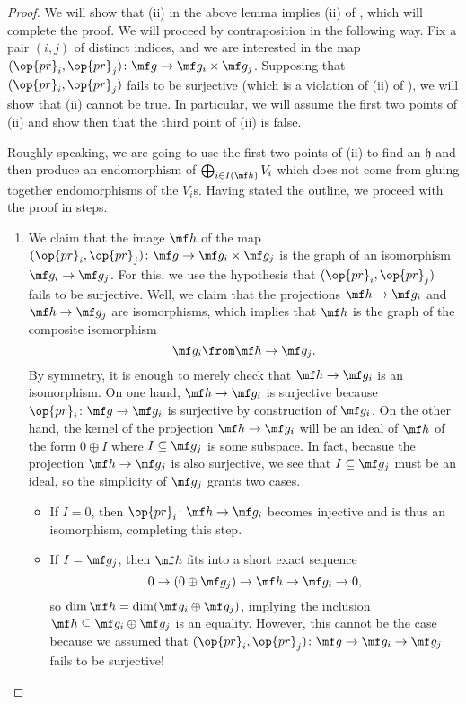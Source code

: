 \documentclass[../thesis.tex]{subfiles}
\begin{document}
\begin{proof}
	We will show that (ii) in the above lemma implies (ii) of , which will complete the proof. We will proceed by contraposition in the following way. Fix a pair $(i,j)$ of distinct indices, and we are interested in the map $({\op{pr}_i},{\op{pr}_j})\colon\mf g\to\mf g_i\times\mf g_j$. Supposing that $({\op{pr}_i},{\op{pr}_j})$ fails to be surjective (which is a violation of (ii) of ), we will show that (ii) cannot be true. In particular, we will assume the first two points of (ii) and show then that the third point of (ii) is false.
	
	Roughly speaking, we are going to use the first two points of (ii) to find an $\mathfrak h$ and then produce an endomorphism of $\bigoplus_{i\in I(\mf h)}V_i$ which does not come from gluing together endomorphisms of the $V_i$s. Having stated the outline, we proceed with the proof in steps.
	\begin{enumerate}
		\item We claim that the image $\mf h$ of the map $({\op{pr}_i},{\op{pr}_j})\colon\mf g\to\mf g_i\times\mf g_j$ is the graph of an isomorphism $\mf g_i\to\mf g_j$. For this, we use the hypothesis that $({\op{pr}_i},{\op{pr}_j})$ fails to be surjective. Well, we claim that the projections $\mf h\to\mf g_i$ and $\mf h\to\mf g_j$ are isomorphisms, which implies that $\mf h$ is the graph of the composite isomorphism
		\[\mf g_i\from\mf h\to\mf g_j.\]
		By symmetry, it is enough to merely check that $\mf h\to\mf g_i$ is an isomorphism. On one hand, $\mf h\to\mf g_i$ is surjective because $\op{pr}_i\colon\mf g\to\mf g_i$ is surjective by construction of $\mf g_i$. On the other hand, the kernel of the projection $\mf h\to\mf g_i$ will be an ideal of $\mf h$ of the form $0\oplus I$ where $I\subseteq\mf g_j$ is some subspace. In fact, becasue the projection $\mf h\to\mf g_j$ is also surjective, we see that $I\subseteq\mf g_j$ must be an ideal, so the simplicity of $\mf g_j$ grants two cases.
		\begin{itemize}
			\item If $I=0$, then $\op{pr}_i\colon\mf h\to\mf g_i$ becomes injective and is thus an isomorphism, completing this step.
			\item If $I=\mf g_j$, then $\mf h$ fits into a short exact sequence
			\[0\to(0\oplus\mf g_j)\to\mf h\to\mf g_i\to0,\]
			so $\dim\mf h=\dim(\mf g_i\oplus\mf g_j)$, implying the inclusion $\mf h\subseteq\mf g_i\oplus\mf g_j$ is an equality. However, this cannot be the case because we assumed that $({\op{pr}_i},{\op{pr}_j})\colon\mf g\to\mf g_i\to\mf g_j$ fails to be surjective!
		\end{itemize}


\end{enumerate}
\end{proof}
\end{document}

